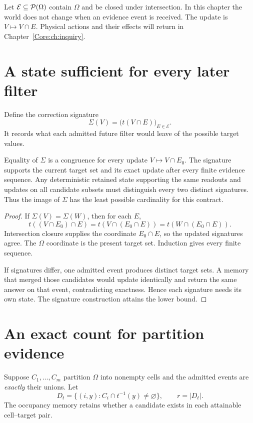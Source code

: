 Let $\mathcal E\subseteq\mathcal P(\Omega)$ contain $\Omega$ and be closed under intersection. In this chapter the world does not change when an evidence event is received. The update is $V\mapsto V\cap E$. Physical actions and their effects will return in Chapter~\ref{Core:ch:inquiry}.

\section{A state sufficient for every later filter}
Define the correction signature
\[
\Sigma(V)=\bigl(t(V\cap E)\bigr)_{E\in\mathcal E}.
\]
It records what each admitted future filter would leave of the possible target values.

\begin{Coretheorem}\label{Core:r:memory}
Equality of $\Sigma$ is a congruence for every update $V\mapsto V\cap E_0$. The signature supports the current target set and its exact update after every finite evidence sequence. Any deterministic retained state supporting the same readouts and updates on all candidate subsets must distinguish every two distinct signatures. Thus the image of $\Sigma$ has the least possible cardinality for this contract.
\end{Coretheorem}
\begin{proof}
If $\Sigma(V)=\Sigma(W)$, then for each $E$,
\[
t((V\cap E_0)\cap E)=t(V\cap(E_0\cap E))=t(W\cap(E_0\cap E)).
\]
Intersection closure supplies the coordinate $E_0\cap E$, so the updated signatures agree. The $\Omega$ coordinate is the present target set. Induction gives every finite sequence.

If signatures differ, one admitted event produces distinct target sets. A memory that merged those candidates would update identically and return the same answer on that event, contradicting exactness. Hence each signature needs its own state. The signature construction attains the lower bound.
\end{proof}

\section{An exact count for partition evidence}
Suppose $C_1,\ldots,C_m$ partition $\Omega$ into nonempty cells and the admitted events are \emph{exactly} their unions. Let
\[
D_t=\{(i,y): C_i\cap t^{-1}(y)\ne\varnothing\},\qquad r=|D_t|.
\]
The occupancy memory retains whether a candidate exists in each attainable cell--target pair.

